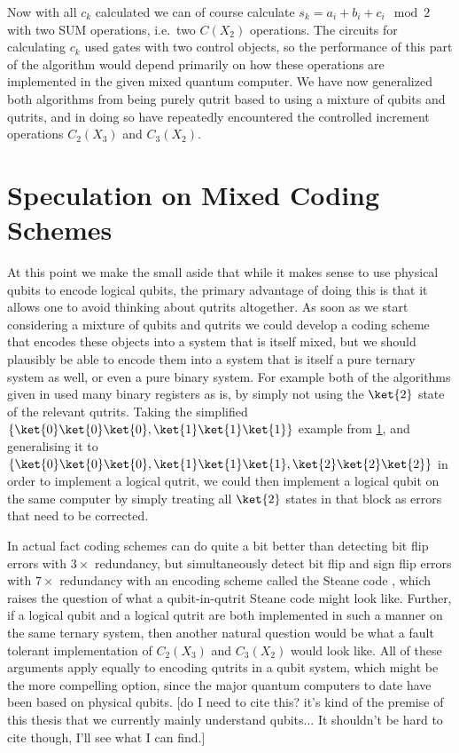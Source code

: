 Now with all $c_k$ calculated we can of course calculate $s_k = a_i + b_i + c_i \mod 2$ with two SUM operations, i.e.\ two $C(X_2)$ operations. The circuits for calculating $c_k$ used gates with two control objects, so the performance of this part of the algorithm would depend primarily on how these operations are implemented in the given mixed quantum computer. We have now generalized both algorithms from being purely qutrit based to using a mixture of qubits and qutrits, and in doing so have repeatedly encountered the controlled increment operations $C_2(X_3)$ and $C_3(X_2)$.

\section{Speculation on Mixed Coding Schemes}
At this point we make the small aside that while it makes sense to use physical qubits to encode logical qubits, the primary advantage of doing this is that it allows one to avoid thinking about qutrits altogether. As soon as we start considering a mixture of qubits and qutrits we could develop a coding scheme that encodes these objects into a system that is itself mixed, but we should plausibly be able to encode them into a system that is itself a pure ternary system as well, or even a pure binary system. For example both of the algorithms given in \cite{arithmetics} used many binary registers as is, by simply not using the $\ket{2}$ state of the relevant qutrits. Taking the simplified $\{\ket{0}\ket{0}\ket{0}, \ket{1}\ket{1}\ket{1}\}$ example from \ref{}, and generalising it to $\{\ket{0}\ket{0}\ket{0}, \ket{1}\ket{1}\ket{1}, \ket{2}\ket{2}\ket{2}\}$ in order to implement a logical qutrit, we could then implement a logical qubit on the same computer by simply treating all $\ket{2}$ states in that block as errors that need to be corrected.

In actual fact coding schemes can do quite a bit better than detecting bit flip errors with $3\times$ redundancy, but simultaneously detect bit flip and sign flip errors with $7\times$ redundancy with an encoding scheme called the Steane code \cite{steane-code}, which raises the question of what a qubit-in-qutrit Steane code might look like. Further, if a logical qubit and a logical qutrit are both implemented in such a manner on the same ternary system, then another natural question would be what a fault tolerant implementation of $C_2(X_3)$ and $C_3(X_2)$ would look like. All of these arguments apply equally to encoding qutrits in a qubit system, which might be the more compelling option, since the major quantum computers to date have been based on physical qubits. [do I need to cite this? it's kind of the premise of this thesis that we currently mainly understand qubits... It shouldn't be hard to cite though, I'll see what I can find.]

